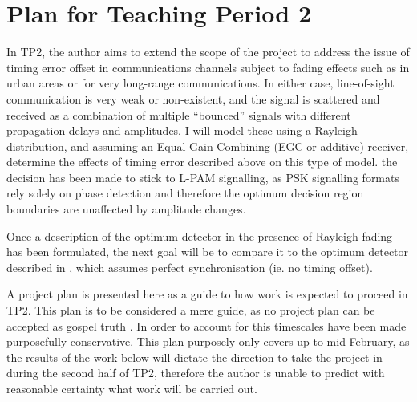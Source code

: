 \chapter{Plan for Teaching Period 2}

In TP2, the author aims to extend the scope of the project to address the issue of
timing error offset in communications channels subject to fading effects
such as in urban areas or for very long-range communications. In either
case, line-of-sight communication is very weak or non-existent, and the
signal is scattered and received as a combination of multiple
``bounced'' signals with different propagation delays and amplitudes. I
will model these using a Rayleigh distribution, and assuming an Equal
Gain Combining (EGC or additive) receiver, determine the effects of
timing error described above on this type of model. the decision has been made to stick to
L-PAM signalling, as PSK signalling formats rely solely on phase
detection and therefore the optimum decision region boundaries are
unaffected by amplitude changes.

Once a description of the optimum detector in the presence of
Rayleigh fading has been formulated, the next goal will be to compare it to the optimum
detector described in \cite{[2]}, which assumes perfect
synchronisation (ie. no timing offset).

A project plan is presented here as a guide to how work is expected to
proceed in TP2. This plan is to be considered a mere guide, as no project plan can be accepted as gospel truth \cite{[11]}. In order to account for this timescales have been made
purposefully conservative. This plan purposely only covers up to mid-February, as the results of the work below will dictate the direction to take the project in during the second half of TP2, therefore the author is unable to predict with reasonable certainty what work will be carried out.

